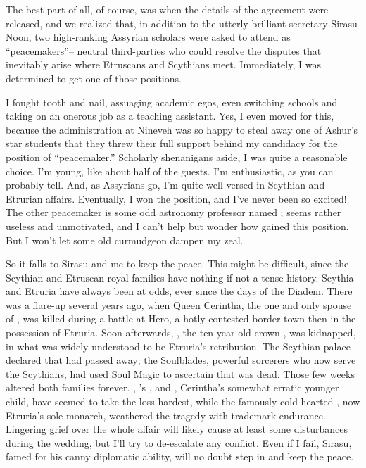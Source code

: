 \documentclass[char]{Kos}
\begin{document}
The best part of all, of course, was when the details of the agreement were released, and we realized that, in addition to the utterly brilliant secretary Sirasu Noon, two high-ranking Assyrian scholars were asked to attend as ``peacemakers''-- neutral third-parties who could resolve the disputes that inevitably arise where Etruscans and Scythians meet. Immediately, I was determined to get one of those positions.

I fought tooth and nail, assuaging academic egos, even switching schools and taking on an onerous job as a teaching assistant. Yes, I even moved for this, because the administration at Nineveh was so happy to steal away one of Ashur's star students that they threw their full support behind my candidacy for the position of ``peacemaker.'' Scholarly shenanigans aside, I was quite a reasonable choice. I'm young, like about half of the guests. I'm enthusiastic, as you can probably tell. And, as Assyrians go, I'm quite well-versed in Scythian and Etrurian affairs. Eventually, I won the position, and I've never been so excited! The other peacemaker is some odd astronomy professor named \cAnarchist{}; \cAnarchist{\they} seems rather useless and unmotivated, and I can't help but wonder how \cAnarchist{\they} gained this position. But I won't let some old curmudgeon dampen my zeal.

So it falls to Sirasu and me to keep the peace. This might be difficult, since the Scythian and Etruscan royal families have nothing if not a tense history. Scythia and Etruria have always been at odds, ever since the days of the Diadem. There was a flare-up several years ago, when Queen Cerintha, the one and only spouse of \cEtruriaKing{}, was killed during a battle at Hero, a hotly-contested border town then in the possession of Etruria. Soon afterwards, \cFugitive{}, the ten-year-old crown \cFugitive{\prince}, was kidnapped, in what was widely understood to be Etruria's retribution. The Scythian palace declared that \cFugitive{} had passed away; the Soulblades, powerful sorcerers who now serve the Scythians, had used Soul Magic to ascertain that \cFugitive{\they} was dead. Those few weeks altered both families forever. \cScythiaQueen{}, \cFugitive{}'s \cScythiaQueen{\parent}, and \cPoet{}, Cerintha's somewhat erratic younger child, have seemed to take the loss hardest, while the famously cold-hearted \cEtruriaKing{}, now Etruria's sole monarch, weathered the tragedy with \cEtruriaKing{\their} trademark endurance. Lingering grief over the whole affair will likely cause at least some disturbances during the wedding, but I'll try to de-escalate any conflict. Even if I fail, Sirasu, famed for his canny diplomatic ability, will no doubt step in and keep the peace.
\end{document}
